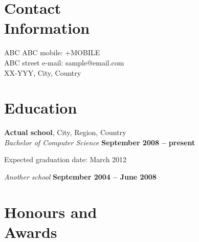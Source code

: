 \documentclass[margin,line]{resume}
\begin{document}
\begin{resume}

    \section{\mysidestyle Contact\\Information}

    ABC ABC                                     \hfill mobile: +MOBILE                \vspace{0mm}\\\vspace{0mm}%
    ABC street                                  \hfill e-mail: sample@email.com       \vspace{0mm}\\\vspace{0mm}%
    XX-YYY, City, Country      

    \section{\mysidestyle Education}

    \textbf{Actual school}, City, Region, Country \vspace{2mm}\\\vspace{1mm}%
    \textsl{Bachelor of Computer Science} \hfill \textbf{ September 2008 -- present }\vspace{-3mm}\\\vspace{-1mm}%
    \begin{list2}
        \item Expected graduation date: March 2012
    \end{list2}\vspace{-1.5mm}
    \textsl{Another school} \hfill \textbf{ September 2004 -- June 2008 }\vspace{-3mm}\\\vspace{-1mm}%

    \section{\mysidestyle Honours and\\Awards} 


\end{resume}
\end{document}

